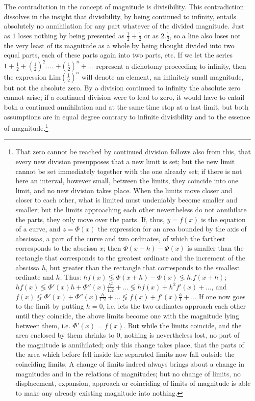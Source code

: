 \documentclass[12pt,a4paper,openany]{book}
\newcommand{\opage}[1]{\marginnote{\footnotesize\textit{[#1]}}}
\begin{document}
The contradiction in the concept of magnitude is divisibility.
This contradiction dissolves in the insight that divisibility,
by being continued to infinity, entails absolutely no
annihilation for any part whatever of the divided
magnitude. Just as $1$ loses nothing by being presented
as $\frac{1}{2}+\frac{1}{2}$ or as $2.\frac{1}{2}$, so a line also loses
not the very least of its magnitude as a whole by being
thought divided into two equal parts, each of these parts again
into two parts, etc. If we let the series $1+\frac{1}{2}+\left(\frac{1}{2}\right)^{2}....$
\setcounter{footnote}{0}%
\opage{122}$+\left(\frac{1}{2}\right)^{n}+\ldots$ represent a dichotomy
proceeding to infinity, then the expression $\mathrm{Lim}\left(\frac{1}{2}\right)^{n}$ will denote an element,
an infinitely small magnitude, but not the absolute zero. By
a division continued to infinity the absolute zero cannot
arise; if a continued division were to lead to zero, it would have
to entail both a continued annihilation and at the same time
stop at a last limit, but both assumptions are in
equal degree contrary to infinite divisibility and to the
essence of magnitude.\footnote[1]{That zero cannot be reached by continued division follows also from this, that every new division presupposes that a new limit is set; but the new limit cannot be set immediately together with the one already set; if there is not here an interval, however small, between the limits, they coincide into one limit, and no new division takes place. When the limits move closer and closer to each other, what is limited must undeniably become smaller and smaller; but the limits approaching each other nevertheless do not annihilate the parts, they only move over the parts. If, thus, $y=f(x)$ is the equation of a curve, and $z=\Phi(x)$ the expression for an area bounded by the axis of abscissas, a part of the curve and two ordinates, of which the farthest corresponds to the abscissa $x$; then $\Phi(x+h)-\Phi(x)$ is smaller than the rectangle that corresponds to the greatest ordinate and the increment of the abscissa $h$, but greater than the rectangle that corresponds to the smallest ordinate and $h$. Thus: $h f(x) \lessgtr \Phi(x+h)-\Phi(x) \lessgtr h.f(x+h)$; $h f(x) \lessgtr \Phi'(x) h+\Phi''(x)\frac{h^{2}}{1.2}+\ldots \lessgtr h f(x)+h^{2} f'(x)+\ldots$, and $f(x) \lessgtr \Phi'(x)+\Phi''(x)\frac{h}{1.2}+\ldots \lessgtr f(x)+f'(x)\frac{h}{1}+\ldots$ If one now goes to the limit by putting $h=0$, i.e. lets the two ordinates approach each other until they coincide, the above limits become one with the magnitude lying between them, i.e. $\Phi'(x)=f(x)$. But while the limits coincide, and the area enclosed by them shrinks to $0$, nothing is nevertheless lost, no part of the magnitude is annihilated; only this change takes place, that the parts of the area which before fell inside the separated limits now fall outside the coinciding limits. A change of limits indeed always brings about a change in magnitudes and in the relations of magnitudes; but no change of limits, no displacement, expansion, approach or coinciding of limits of magnitude is able to make any already existing magnitude into nothing.}
\end{document}
